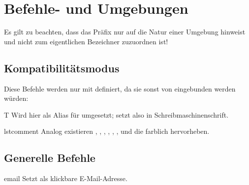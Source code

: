 \documentclass{sopra-base}
\begin{document}
%
%
%
%

\section{Befehle- und Umgebungen}

Es gilt zu beachten, dass das Präfix  nur auf die Natur einer Umgebung hinweist und nicht zum eigentlichen Bezeichner zuzuordnen ist!


\subsection{Kompatibilitätsmodus}

\begin{center}
\end{center}

Diese Befehle werden nur mit  definiert, da sie sonst von  eingebunden
werden würden:

\begin{command}{T}{}
    Wird hier als Alias für  umgesetzt; setzt  also in Schreibmaschinenschrift.
\end{command}


\begin{command}{lstcomment}{}
    Analog existieren , , , , , ,  und  die  farblich hervorheben.
\end{command}


\subsection{Generelle Befehle}

\begin{command}{email}{}
    Setzt  als klickbare E-Mail-Adresse.
\end{command}
\end{document}
